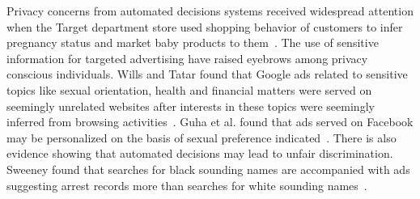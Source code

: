 \documentclass[10pt, onecolumn]{report}
\begin{document}
Privacy concerns from automated decisions systems received widespread
attention when the Target department store used shopping behavior of customers
to infer pregnancy status and market baby products to them~\cite{targetnytimes}. 
The use of sensitive information for targeted advertising have raised eyebrows among
privacy conscious individuals.
Wills and Tatar found that Google ads related to sensitive topics 
like sexual orientation, health and financial matters were served on seemingly unrelated 
websites after interests in these topics were seemingly inferred from 
browsing activities~\cite{wills12wpes-tr}. Guha et al. found that ads 
served on Facebook may be personalized on the basis of sexual preference 
indicated~\cite{guha10imc}.
There is also evidence showing that automated decisions may lead to 
unfair discrimination. Sweeney found that searches for black sounding names 
are accompanied with ads suggesting arrest records more than searches for 
white sounding names~\cite{sweeney13cacm}. 
\end{document}

